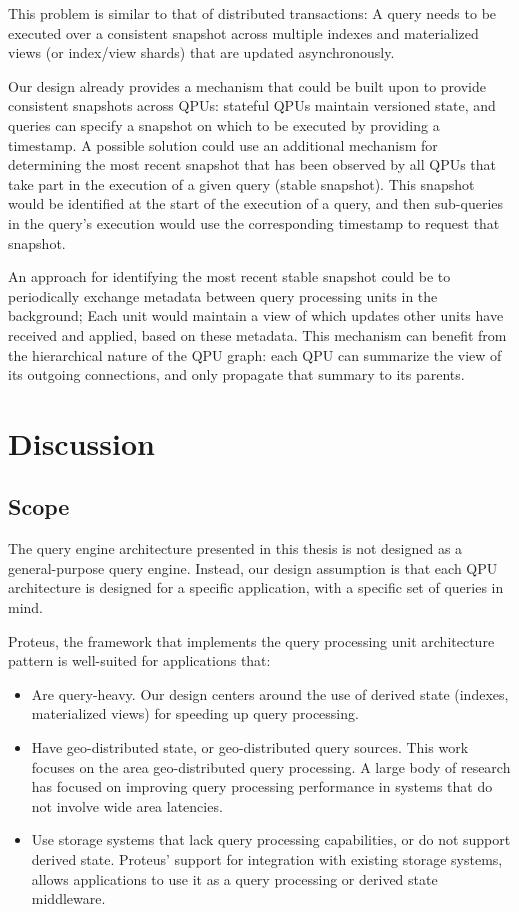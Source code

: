 This problem is similar to that of distributed transactions:
A query needs to be executed over a consistent snapshot across multiple indexes and materialized views (or index/view shards)
that are updated asynchronously.

Our design already provides a mechanism that could be built upon to provide consistent snapshots across QPUs:
stateful QPUs maintain versioned state,
and queries can specify a snapshot on which to be executed by providing a timestamp.
A possible solution could use an additional mechanism for determining the most recent snapshot that has been observed by
all QPUs that take part in the execution of a given query (stable snapshot).
This snapshot would be identified at the start of the execution of a query,
and then sub-queries in the query's execution would use the corresponding timestamp to request that snapshot.

An approach for identifying the most recent stable snapshot could be to periodically exchange
metadata between query processing units in the background;
Each unit would maintain a view of which updates other units have received and applied, based on these metadata.
This mechanism can benefit from the hierarchical nature of the QPU graph:
each QPU can summarize the view of its outgoing connections, and only propagate that summary to its parents.


\section{Discussion}

\subsection{Scope}

The query engine architecture presented in this thesis is not designed as a general-purpose query engine.
Instead, our design assumption is that each QPU architecture is designed for a specific application,
with a specific set of queries in mind.

Proteus, the framework that implements the query processing unit architecture pattern is well-suited for applications that:
\begin{itemize}
  \item Are query-heavy. Our design centers around the use of derived state (indexes, materialized views) for speeding up
  query processing.

  \item Have geo-distributed state, or geo-distributed query sources.
  This work focuses on the area geo-distributed query processing.
  A large body of research has focused on improving query processing performance in systems that do not involve
  wide area latencies.

  \item Use storage systems that lack query processing capabilities, or do not support derived state.
  Proteus' support for integration with existing storage systems,
  allows applications to use it as a query processing or derived state middleware.
\end{itemize}

